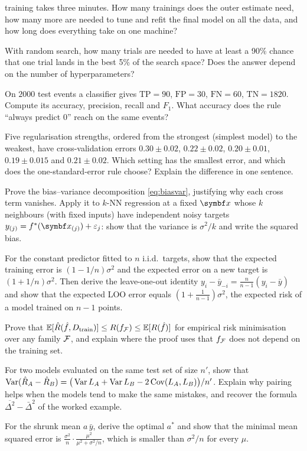 \documentclass[11pt]{article}
\begin{document}
\begin{questions}
\begin{calculations}
training takes three minutes. How many trainings does the outer estimate need, how many more are needed to tune and
refit the final model on all the data, and how long does everything take on one machine?
\item With random search, how many trials are needed to have at least a 90\% chance that one trial lands in the best
5\% of the search space? Does the answer depend on the number of hyperparameters?
\item On $2000$ test events a classifier gives $\mathrm{TP} = 90$, $\mathrm{FP} = 30$, $\mathrm{FN} = 60$,
$\mathrm{TN} = 1820$. Compute its accuracy, precision, recall and $F_1$. What accuracy does the rule ``always predict
$0$'' reach on the same events?
\item Five regularisation strengths, ordered from the strongest (simplest model) to the weakest, have cross-validation
errors $0.30 \pm 0.02$, $0.22 \pm 0.02$, $0.20 \pm 0.01$, $0.19 \pm 0.015$ and $0.21 \pm 0.02$. Which setting has the
smallest error, and which does the one-standard-error rule choose? Explain the difference in one sentence.
\end{calculations}

\begin{derivations}
\item Prove the bias--variance decomposition \eqref{eq:biasvar}, justifying why each cross term vanishes. Apply it to
$k$-NN regression at a fixed $\x$ whose $k$ neighbours (with fixed inputs) have independent noisy targets
$y_{(j)} = f^*(\x_{(j)}) + \varepsilon_j$: show that the variance is $\sigma^2/k$ and write the squared bias.
\item For the constant predictor fitted to $n$ i.i.d.\ targets, show that the expected training error is
$(1 - 1/n)\sigma^2$ and the expected error on a new target is $(1 + 1/n)\sigma^2$. Then derive the leave-one-out
identity $y_i - \bar y_{-i} = \frac{n}{n-1}(y_i - \bar y)$ and show that the expected LOO error equals
$(1 + \frac{1}{n-1})\sigma^2$, the expected risk of a model trained on $n - 1$ points.
\item Prove that $\mathbb{E}[\hat R(\hat f, D_{\mathrm{train}})] \le R(f_{\mathcal{F}}) \le \mathbb{E}[R(\hat f)]$ for empirical risk minimisation
over any family $\mathcal{F}$, and explain where the proof uses that $f_{\mathcal{F}}$ does not depend on the training set.
\item For two models evaluated on the same test set of size $n'$, show that
$\operatorname{Var}(\hat R_A - \hat R_B) = \big(\operatorname{Var} L_A + \operatorname{Var} L_B - 2\operatorname{Cov}(L_A, L_B)\big)/n'$. Explain why pairing helps when the
models tend to make the same mistakes, and recover the formula $\overline{\Delta^2} - \bar\Delta^2$ of the worked example.
\item For the shrunk mean $a\,\bar y$, derive the optimal $a^*$ and show that the minimal mean squared error is
$\frac{\sigma^2}{n}\cdot\frac{\mu^2}{\mu^2 + \sigma^2/n}$, which is smaller than $\sigma^2/n$ for every $\mu$.
\end{derivations}


\end{questions}
\end{document}
